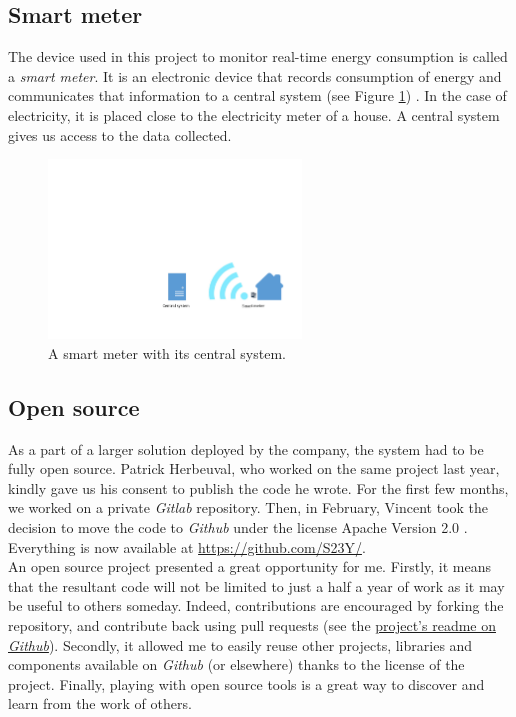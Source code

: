 \documentclass[a4paper, oneside, 11pt]{book}
\begin{document}
\subsection{Smart meter}
The device used in this project to monitor real-time energy consumption is called a \emph{smart meter}. It is an electronic device that records consumption of energy and communicates that information to a central system (see Figure \ref{fig:smartmeter_central}) \cite{Smartmeter:online}. In the case of electricity, it is placed close to the electricity meter of a house. A central system gives us access to the data collected.

\begin{figure}[htbp]
	\centerline{\includegraphics[width=0.6\textwidth]{smartmeter_central.pdf}}
	\caption{A smart meter with its central system.}
	\label{fig:smartmeter_central}
\end{figure}

\subsection{Open source}
As a part of a larger solution deployed by the company, the system had to be fully open source. Patrick Herbeuval, who worked on the same project last year, kindly gave us his consent to publish the code he wrote. For the first few months, we worked on a private \textit{Gitlab} repository. Then, in February, Vincent took the decision to move the code to \textit{Github} under the license Apache Version 2.0 \cite{Apache:online}. Everything is now available at \url{https://github.com/S23Y/}.\\

An open source project presented a great opportunity for me. Firstly, it means that the resultant code will not be limited to just a half a year of work as it may be useful to others someday. Indeed, contributions are encouraged by forking the repository, and contribute back using pull requests (see the \href{https://github.com/S23Y/myconsumption-android}{project’s readme on \textit{Github}}). Secondly, it allowed me to easily reuse other projects, libraries and components available on \textit{Github} (or elsewhere) thanks to the license of the project. Finally, playing with open source tools is a great way to discover and learn from the work of others.
\end{document}
